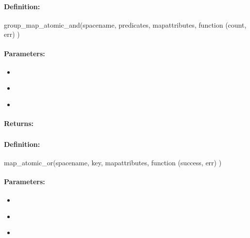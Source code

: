 \paragraph{Definition:}
\begin{javascriptcode}
group_map_atomic_and(spacename, predicates, mapattributes, function (count, err) {})
\end{javascriptcode}
\paragraph{Parameters:}
\begin{itemize}[noitemsep]
\item {}\\

\item {}\\

\item {}\\

\end{itemize}

\paragraph{Returns:}


\pagebreak
\subsubsection{}
\label{api:nodejs:map_atomic_or}


\paragraph{Definition:}
\begin{javascriptcode}
map_atomic_or(spacename, key, mapattributes, function (success, err) {})
\end{javascriptcode}
\paragraph{Parameters:}
\begin{itemize}[noitemsep]
\item {}\\

\item {}\\

\item {}\\

\end{itemize}

